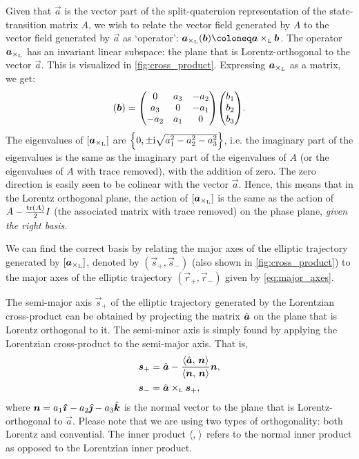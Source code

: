 Given that \(\vec{a}\) is the vector part of the split-quaternion representation of the state-transition matrix \(A\), we wish to relate the vector field generated by \(A\) to the vector field generated by \(\vec{a}\) as `operator': \(\vec{a}_{\lorcrossp{}{}}(\vec{b}) \coloneq \lorcrossp{\vec{a}}{\vec{b}}\). The operator \(\vec{a}_{\lorcrossp{}{}}\) has an invariant linear subspace: the plane that is Lorentz-orthogonal to the vector \(\vec{a}\). This is visualized in \cref{fig:cross_product}. Expressing \(\vec{a}_{\lorcrossp{}{}}\) as a matrix, we get:
\begin{equation}
    [\vec{a}_{\lorcrossp{}{}}](\vec{b}) = \mqty(0 & a_3 & -a_2 \\ a_3 & 0 & -a_1 \\ -a_2 & a_1 & 0) \mqty(b_1\\b_2\\b_3).
\end{equation}
The eigenvalues of \( [\vec{a}_{\lorcrossp{}{}}] \)  are \(\qty{0, \pm \ensuremath{\mathrm{i}}\sqrt{a_1^2 - a_2^2 - a_3^2}}\), i.e. the imaginary part of the eigenvalues is the same as the imaginary part of the eigenvalues of \(A\) (or the eigenvalues of \(A\) with trace removed), with the addition of zero. The zero direction is easily seen to be colinear with the vector \(\vec{a}\).  Hence, this means that in the Lorentz orthogonal plane, the action of \( [\vec{a}_{\lorcrossp{}{}}] \) is the same as the action of \(A - \frac{\tr(A)}{2}I\) (the associated matrix with trace removed) on the phase plane, \emph{given the right basis}.

We can find the correct basis by relating the major axes of the elliptic trajectory generated by \( [\vec{a}_{\lorcrossp{}{}}] \), denoted by \((\vec{s}_+, \vec{s}_-)\) (also shown in \cref{fig:cross_product})
to the major axes of the elliptic trajectory \((\vec{r}_+, \vec{r}_-)\) given by \cref{eq:major_axes}. 

The semi-major axis \(\vec{s}_+\) of the elliptic trajectory generated by the Lorentzian cross-product can be obtained by projecting the matrix \(\uvec{a}\) on the plane that is Lorentz orthogonal to it. The semi-minor axis is simply found by applying the Lorentzian cross-product to the semi-major axis. That is,
\begin{equation}
    \begin{split}
        \vec{s}_+ &= \uvec{a} - \frac{ \inner{\uvec{a}}{\vec{n}} }{ \inner{\vec{n}}{\vec{n}} } \vec{n}, \\
        \vec{s}_- &= \lorcrossp{\uvec{a}}{\vec{s}_+}, \\
    \end{split}
\end{equation}
where \(\vec{n} = a_1\quati - a_2\quatj - a_3\quatk\) is the normal vector to the plane that is Lorentz-orthogonal to \(\vec{a}\). Please note that we are using two types of orthogonality: both Lorentz and convential. The inner product \(\langle ,\, \rangle\) refers to the normal inner product as opposed to the Lorentzian inner product.

